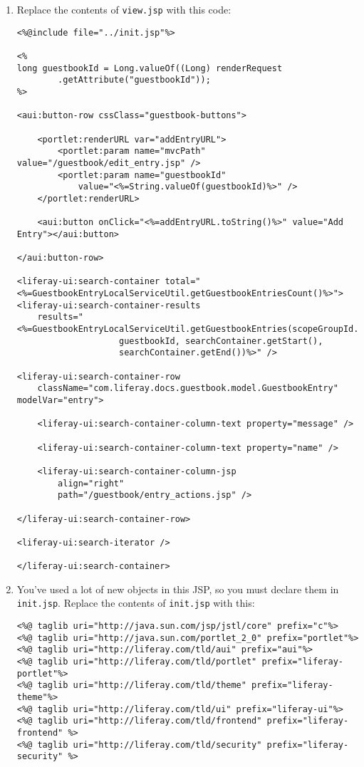 \begin{enumerate}
\def\labelenumi{\arabic{enumi}.}
\item
  Replace the contents of \texttt{view.jsp} with this code:

\begin{verbatim}
<%@include file="../init.jsp"%>

<%
long guestbookId = Long.valueOf((Long) renderRequest
        .getAttribute("guestbookId"));
%>

<aui:button-row cssClass="guestbook-buttons">

    <portlet:renderURL var="addEntryURL">
        <portlet:param name="mvcPath" value="/guestbook/edit_entry.jsp" />
        <portlet:param name="guestbookId"
            value="<%=String.valueOf(guestbookId)%>" />
    </portlet:renderURL>

    <aui:button onClick="<%=addEntryURL.toString()%>" value="Add Entry"></aui:button>

</aui:button-row>

<liferay-ui:search-container total="<%=GuestbookEntryLocalServiceUtil.getGuestbookEntriesCount()%>">
<liferay-ui:search-container-results
    results="<%=GuestbookEntryLocalServiceUtil.getGuestbookEntries(scopeGroupId.longValue(),
                    guestbookId, searchContainer.getStart(),
                    searchContainer.getEnd())%>" />

<liferay-ui:search-container-row
    className="com.liferay.docs.guestbook.model.GuestbookEntry" modelVar="entry">

    <liferay-ui:search-container-column-text property="message" />

    <liferay-ui:search-container-column-text property="name" />

    <liferay-ui:search-container-column-jsp
        align="right"
        path="/guestbook/entry_actions.jsp" />

</liferay-ui:search-container-row>

<liferay-ui:search-iterator />

</liferay-ui:search-container>
\end{verbatim}
\item
  You've used a lot of new objects in this JSP, so you must declare them
  in \texttt{init.jsp}. Replace the contents of \texttt{init.jsp} with
  this:

\begin{verbatim}
<%@ taglib uri="http://java.sun.com/jsp/jstl/core" prefix="c"%>
<%@ taglib uri="http://java.sun.com/portlet_2_0" prefix="portlet"%>
<%@ taglib uri="http://liferay.com/tld/aui" prefix="aui"%>
<%@ taglib uri="http://liferay.com/tld/portlet" prefix="liferay-portlet"%>
<%@ taglib uri="http://liferay.com/tld/theme" prefix="liferay-theme"%>
<%@ taglib uri="http://liferay.com/tld/ui" prefix="liferay-ui"%>
<%@ taglib uri="http://liferay.com/tld/frontend" prefix="liferay-frontend" %>
<%@ taglib uri="http://liferay.com/tld/security" prefix="liferay-security" %>


\end{verbatim}
\end{enumerate}
